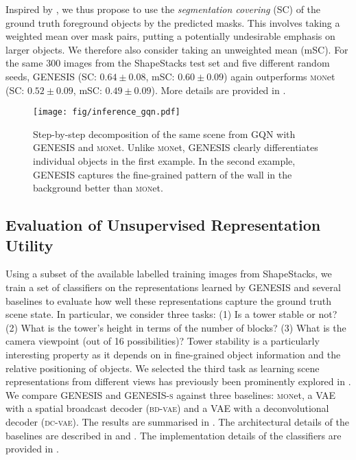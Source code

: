 \documentclass{article}
\begin{document}
Inspired by \citet{arbelaez2010contour}, we thus propose to use the \emph{segmentation covering} (SC) of the ground truth foreground objects by the predicted masks.
This involves taking a weighted mean over mask pairs, putting a potentially undesirable emphasis on larger objects.
We therefore also consider taking an unweighted mean (mSC).
For the same 300 images from the ShapeStacks test set and five different random seeds, \gls{GENESIS} (SC: $0.64\pm0.08$, mSC: $0.60\pm0.09$) again outperforms \textsc{mon}et (SC: $0.52\pm0.09$, mSC: $0.49\pm0.09$).
More details are provided in .


\begin{figure}[h]
    \centering
    \texttt{[image: fig/inference\_gqn.pdf]}
    \caption{Step-by-step decomposition of the same scene from GQN with \gls{GENESIS} and \textsc{mon}et. Unlike \textsc{mon}et, \gls{GENESIS} clearly differentiates individual objects in the first example. In the second example, \gls{GENESIS} captures the fine-grained pattern of the wall in the background better than \textsc{mon}et.}
    \label{fig:decomposition_gqn}
\end{figure}








\subsection{Evaluation of Unsupervised Representation Utility}
\label{sec:semi}

Using a subset of the available labelled training images from ShapeStacks, we train a set of classifiers on the representations learned by \gls{GENESIS} and several baselines to evaluate how well these representations capture the ground truth scene state.
In particular, we consider three tasks: (1) Is a tower stable or not? (2) What is the tower's height in terms of the number of blocks? (3) What is the camera viewpoint (out of 16 possibilities)?
Tower stability is a particularly interesting property as it depends on in fine-grained object information and the relative positioning of objects.
We selected the third task as learning scene representations from different views has previously been prominently explored in \citet{eslami2018neural}.
We compare \gls{GENESIS} and \gls{GENESIS}\textsc{-s} against three baselines: \textsc{mon}et, a \gls{VAE} with a spatial broadcast decoder (\textsc{bd-vae}) and a \gls{VAE} with a deconvolutional decoder (\textsc{dc-vae}).
The results are summarised in .
The architectural details of the baselines are described in  and .
The implementation details of the classifiers are provided in .
\end{document}
